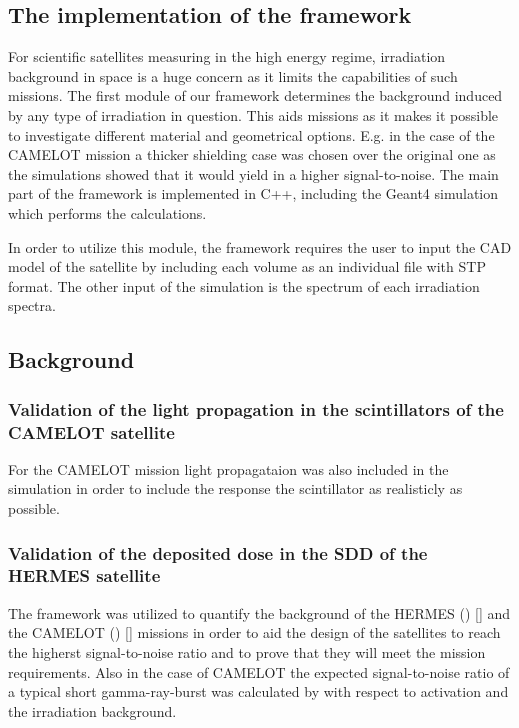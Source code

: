 \documentclass[12pt]{spieman}  %
\begin{document}
\begin{spacing}{2}
\section{The implementation of the framework} 


For scientific satellites measuring in the high energy regime, irradiation background in space is a huge concern as it limits the capabilities of such missions. The first module of our framework determines the background induced by any type of irradiation in question. This aids missions as it makes it possible to investigate different material and geometrical options. E.g. in the case of the CAMELOT mission a thicker shielding case was chosen over the original one as the simulations showed that it would yield in a higher signal-to-noise. The main part of the framework is implemented in C++, including the Geant4 simulation which performs the calculations. 

In order to utilize this module, the framework requires the user to input the CAD model of the satellite by including each volume as an individual file with STP format. The other input of the simulation is the spectrum of each irradiation spectra.

\subsection{Background}

\subsubsection{Validation of the light propagation in the scintillators of the CAMELOT satellite}


For the CAMELOT mission light propagataion was also included in the simulation in order to include the response the scintillator as realisticly as possible. 

\subsubsection{Validation of the deposited dose in the SDD of the HERMES satellite}

The framework was utilized to quantify the background of the HERMES () [] and the CAMELOT () [] missions in order to aid the design of the satellites to reach the higherst signal-to-noise ratio and to prove that they will meet the mission requirements. Also in the case of CAMELOT the expected signal-to-noise ratio of a typical short gamma-ray-burst was calculated by with respect to activation and the irradiation background.



\end{spacing}
\end{document}
